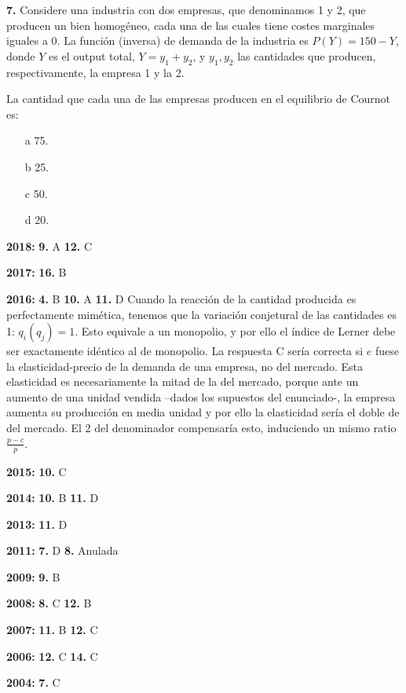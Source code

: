 \documentclass{nuevotema}
\begin{document}
\textbf{7.} Considere una industria con dos empresas, que denominamos 1 y 2, que producen un bien homogéneo, cada una de las cuales tiene costes marginales iguales a 0. La función (inversa) de demanda de la industria es $P(Y) = 150 - Y$, donde $Y$ es el output total, $Y = y_1 + y_2$, y $y_1, y_2$ las cantidades que producen, respectivamente, la empresa 1 y la 2.

La cantidad que cada una de las empresas producen en el equilibrio de Cournot es:

\begin{enumerate}
	\item[a] 75.
	\item[b] 25.
	\item[c] 50.
	\item[d] 20.
\end{enumerate}

\notas

\textbf{2018:} \textbf{9.} A \textbf{12.} C

\textbf{2017:} \textbf{16.} B

\textbf{2016:} \textbf{4.} B \textbf{10.} A \textbf{11.} D Cuando la reacción de la cantidad producida es perfectamente mimética, tenemos que la variación conjetural de las cantidades es 1: $q_i(q_j)=1$. Esto equivale a un monopolio, y por ello el índice de Lerner debe ser exactamente idéntico al de monopolio. La respuesta C sería correcta si $e$ fuese la elasticidad-precio de la demanda de una empresa, no del mercado. Esta elasticidad es necesariamente la mitad de la del mercado, porque ante un aumento de una unidad vendida --dados los supuestos del enunciado-, la empresa aumenta su producción en media unidad y por ello la elasticidad sería el doble de del mercado. El 2 del denominador compensaría esto, induciendo un mismo ratio $\frac{p-c}{p}$.

\textbf{2015:} \textbf{10.} C

\textbf{2014:} \textbf{10.} B \textbf{11.} D

\textbf{2013:} \textbf{11.} D %

\textbf{2011:} \textbf{7.} D \textbf{8.} Anulada

\textbf{2009:} \textbf{9.} B

\textbf{2008:} \textbf{8.} C \textbf{12.} B

\textbf{2007:} \textbf{11.} B \textbf{12.} C

\textbf{2006:} \textbf{12.} C \textbf{14.} C

\textbf{2004:} \textbf{7.} C
\end{document}
